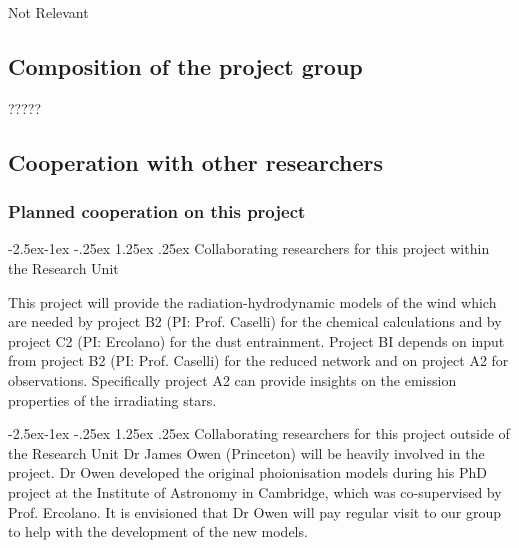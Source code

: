 \documentclass[10pt,fleqn,twoside]{article}
\makeatletter
\newcommand{\Tcol}{\color{blue}}
\renewcommand\paragraph{\@startsection{paragraph}{4}{\z@}%
            {-2.5ex\@plus -1ex \@minus -.25ex}%
            {1.25ex \@plus .25ex}%
            {\normalfont\normalsize\bfseries}}
\makeatother
\begin{document}
Not Relevant

\subsection{\Tcol Composition of the project group}

?????


\subsection{\Tcol Cooperation with other researchers}

\subsubsection{\Tcol Planned cooperation on this project}

\paragraph{\Tcol Collaborating researchers for this project within the
  Research Unit}


This project will provide the radiation-hydrodynamic models of the
wind which are needed by project B2 (PI: Prof. Caselli) for the
chemical calculations and by project C2 (PI: Ercolano) for the dust
entrainment. Project BI depends on input from project B2 (PI:
Prof. Caselli)  for the reduced network and on
project A2 for observations. Specifically project A2 can
provide insights on the emission properties of the irradiating stars.

\paragraph{\Tcol Collaborating researchers for this project outside of
  the Research Unit}
Dr James Owen (Princeton) will be heavily involved in the
project. Dr Owen developed the original
phoionisation models during his PhD project at the Institute of
Astronomy in Cambridge, which was co-supervised by
Prof. Ercolano. It is envisioned that Dr Owen will pay regular visit
to our group to help with the development of the new models. 
\end{document}
